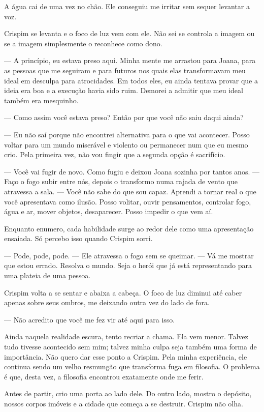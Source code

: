 A água cai de uma vez no chão. Ele conseguiu me irritar sem sequer levantar a voz.

Crispim se levanta e o foco de luz vem com ele. Não sei se controla a imagem ou se a imagem simplesmente o reconhece como dono.

— A princípio, eu estava preso aqui. Minha mente me arrastou para Joana, para as pessoas que me seguiram e para futuros nos quais elas transformavam meu ideal em desculpa para atrocidades. Em todos eles, eu ainda tentava provar que a ideia era boa e a execução havia sido ruim. Demorei a admitir que meu ideal também era mesquinho.

— Como assim você estava preso? Então por que você não saiu daqui ainda?

— Eu não saí porque não encontrei alternativa para o que vai acontecer. Posso voltar para um mundo miserável e violento ou permanecer num que eu mesmo crio. Pela primeira vez, não vou fingir que a segunda opção é sacrifício.

— Você vai fugir de novo. Como fugiu e deixou Joana sozinha por tantos anos. — Faço o fogo subir entre nós, depois o transformo numa rajada de vento que atravessa a sala. — Você não sabe do que sou capaz. Aprendi a tornar real o que você apresentava como ilusão. Posso volitar, ouvir pensamentos, controlar fogo, água e ar, mover objetos, desaparecer. Posso impedir o que vem aí.

Enquanto enumero, cada habilidade surge ao redor dele como uma apresentação ensaiada. Só percebo isso quando Crispim sorri.

— Pode, pode, pode. — Ele atravessa o fogo sem se queimar. — Vá me mostrar que estou errado. Resolva o mundo. Seja o herói que já está representando para uma plateia de uma pessoa.

Crispim volta a se sentar e abaixa a cabeça. O foco de luz diminui até caber apenas sobre seus ombros, me deixando outra vez do lado de fora.

— Não acredito que você me fez vir até aqui para isso.

Ainda naquela realidade escura, tento recriar a chama. Ela vem menor. Talvez tudo tivesse acontecido sem mim; talvez minha culpa seja também uma forma de importância. Não quero dar esse ponto a Crispim. Pela minha experiência, ele continua sendo um velho resmungão que transforma fuga em filosofia. O problema é que, desta vez, a filosofia encontrou exatamente onde me ferir.

Antes de partir, crio uma porta ao lado dele. Do outro lado, mostro o depósito, nossos corpos imóveis e a cidade que começa a se destruir. Crispim não olha.

